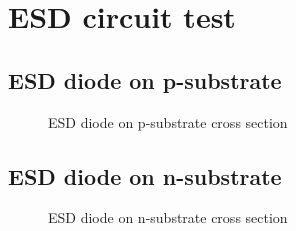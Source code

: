 \section{ESD circuit test}

\subsection{ESD diode on p-substrate}
\begin{figure}[H]
	\centering
	\begin{tikzpicture}[node distance = 3cm, auto, thick,scale=0.5, every node/.style={transform shape}]
		
	\end{tikzpicture}
	\caption{ESD diode on p-substrate cross section}
	\label{p_sub_ESD_cross}
\end{figure}

\subsection{ESD diode on n-substrate}
\begin{figure}[H]
	\centering
	\begin{tikzpicture}[node distance = 3cm, auto, thick,scale=0.5, every node/.style={transform shape}]
		
	\end{tikzpicture}
	\caption{ESD diode on n-substrate cross section}
	\label{n_sub_ESD_cross}
\end{figure}
